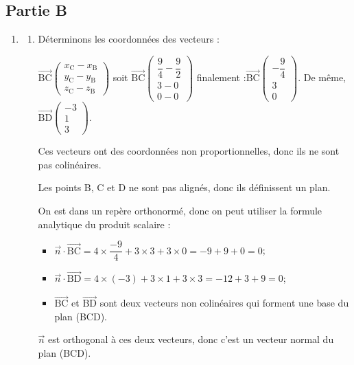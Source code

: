 \documentclass[10pt]{article}
\providecommand{\vect}[1]{\overrightarrow{#1}}
\providecommand{\vectt}[1]{\overrightarrow{\mathrm{#1}}}
\begin{document}
\subsection*{Partie B}
\begin{enumerate}
 \item 
	\begin{enumerate}
		\item 
		Déterminons les coordonnées des vecteurs :
		
		$\vectt{BC} \begin{pmatrix}
			x_{\mathrm{C}} - x_{\mathrm{B}}\\
			y_{\mathrm{C}} - y_{\mathrm{B}}\\
			z_{\mathrm{C}} - z_{\mathrm{B}} \end{pmatrix} $
		\quad soit \quad $\vectt{BC} \begin{pmatrix}\dfrac{9}{4} - \dfrac{9}{2} \\3-0\\0-0 \end{pmatrix} $
		\quad finalement :\quad $\vectt{BC} \begin{pmatrix} -\dfrac{9}{4}\\3\\0\end{pmatrix} $.
		\quad De même, \quad $\vectt{BD} \begin{pmatrix}  -3\\1\\3 \end{pmatrix} $.
		
		Ces vecteurs ont des coordonnées non proportionnelles, donc ils ne sont pas colinéaires.
		
		Les points B, C et D ne sont pas alignés, donc ils définissent un plan.
		
		On est dans un repère orthonormé, donc on peut utiliser la formule analytique du produit scalaire :
		
		\begin{itemize}
			\item $\vect{n} \cdot \vectt{BC} = 4 \times \dfrac{-9}{4} + 3 \times  3 + 3  \times  0 = -9 + 9 +0 = 0$;
			\item $\vect{n} \cdot \vectt{BD} = 4 \times (-3) +3 \times  1 + 3  \times  3 = -12 + 3 + 9 = 0$;
			\item $\vectt{BC}$ et $\vectt{BD}$ sont deux vecteurs non colinéaires qui forment une base du plan (BCD).
				\end{itemize}
			$\vect{n}$ est orthogonal à ces deux vecteurs, donc c'est un vecteur normal du plan (BCD).
			

\end{enumerate}
\end{enumerate}
\end{document}
